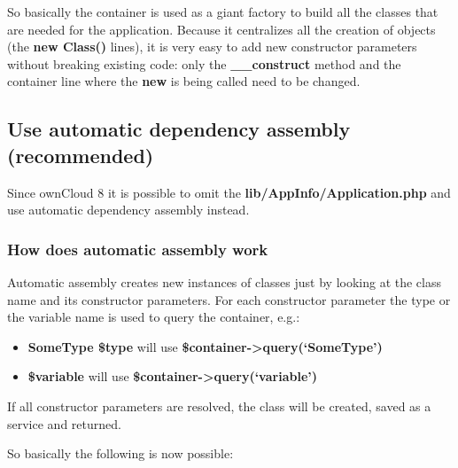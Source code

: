 \documentclass[letterpaper,10pt,english]{sphinxmanual}
\begin{document}
So basically the container is used as a giant factory to build all the classes that are needed for the application. Because it centralizes all the creation of objects (the \textbf{new Class()} lines), it is very easy to add new constructor parameters without breaking existing code: only the \textbf{\_\_construct} method and the container line where the \textbf{new} is being called need to be changed.


\subsection{Use automatic dependency assembly (recommended)}
\label{app/container:use-automatic-dependency-assembly-recommended}

Since ownCloud 8 it is possible to omit the \textbf{lib/AppInfo/Application.php} and use automatic dependency assembly instead.


\subsubsection{How does automatic assembly work}
\label{app/container:how-does-automatic-assembly-work}
Automatic assembly creates new instances of classes just by looking at the class name and its constructor parameters. For each constructor parameter the type or the variable name is used to query the container, e.g.:
\begin{itemize}
\item {} 
\textbf{SomeType \$type} will use \textbf{\$container-\textgreater{}query(`SomeType')}

\item {} 
\textbf{\$variable} will use \textbf{\$container-\textgreater{}query(`variable')}

\end{itemize}

If all constructor parameters are resolved, the class will be created, saved as a service and returned.

So basically the following is now possible:
\end{document}
